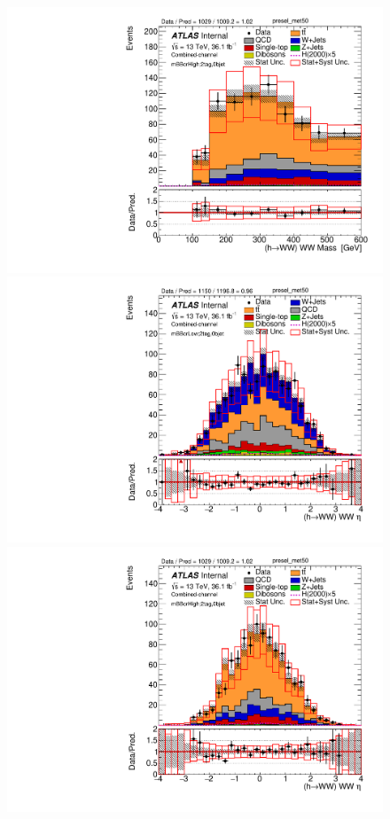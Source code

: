 \begin{figure}[!h]
\begin{center}
\includegraphics[scale=0.33]{./figures/boosted/PlotByMbbRegions/DataMC_2tag_0bjet_mbbcrHigh_lepton_presel_met50_WWMass}                                                                             
\includegraphics[scale=0.33]{./figures/boosted/PlotByMbbRegions/DataMC_2tag_0bjet_mbbcrLow_lepton_presel_met50_WWEta}                                                                               
\includegraphics[scale=0.33]{./figures/boosted/PlotByMbbRegions/DataMC_2tag_0bjet_mbbcrHigh_lepton_presel_met50_WWEta}                                                                              

\end{center}
\end{figure}
